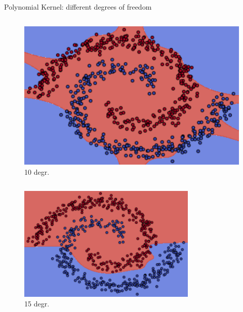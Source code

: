 \documentclass[9.5pt]{beamer}
\begin{document}
\begin{frame}[fragile]{Polynomial Kernel: different degrees of freedom}
\begin{columns}[onlytextwidth]
\begin{figure}
                \includegraphics[width=\linewidth]{images/10}
                \caption{10 degr.}
            \end{figure}
        \end{columns}
        \begin{columns}[onlytextwidth]
            \scriptsize
            \centering
            \begin{figure}
                \centering
                \includegraphics[width=\linewidth]{images/15}
                \caption{15 degr.}
            \end{figure}
            \centering
            \begin{figure}
                \centering

\end{figure}
\end{columns}
\end{frame}
\end{document}
